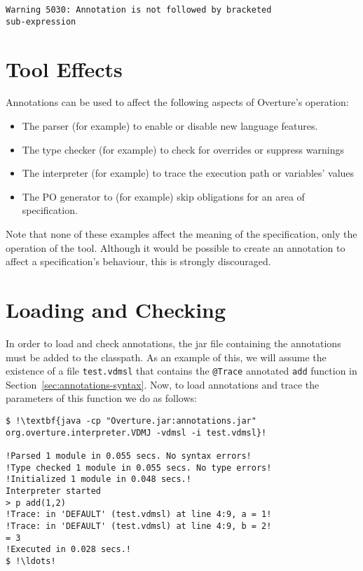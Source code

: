 \noindent \texttt{Warning 5030: Annotation is not followed by
  bracketed\\ sub-expression}\\

\section{Tool Effects}

Annotations can be used to affect the following aspects of Overture's
operation:

\begin{itemize}
  \item The parser (for example) to enable or disable new language
  features.
  \item The type checker (for example) to check for overrides or
  suppress warnings
  \item The interpreter (for example) to trace the execution path or
  variables' values
  \item The PO generator to (for example) skip obligations for an area
  of specification.
\end{itemize}

Note that none of these examples affect the meaning of the
specification, only the operation of the tool. Although it would be
possible to create an annotation to affect a specification's
behaviour, this is strongly discouraged.

\section{Loading and Checking}

In order to load and check annotations, the jar file containing the
annotations must be added to the classpath. As an example of this, we
will assume the existence of a file \lstinline[style=tool]|test.vdmsl|
that contains the \lstinline[language=VDM++]|@Trace| annotated
\lstinline[language=VDM++]|add| function in
Section~\ref{sec:annotations-syntax}. Now, to load annotations and
trace the parameters of this function we do as follows:

\begin{lstlisting}[style=tool,breaklines=true,escapechar=!,frame=tb,label={lst:annotations-cli-ex}]
$ !\textbf{java -cp "Overture.jar:annotations.jar" org.overture.interpreter.VDMJ -vdmsl -i test.vdmsl}!

!Parsed 1 module in 0.055 secs. No syntax errors!
!Type checked 1 module in 0.055 secs. No type errors!
!Initialized 1 module in 0.048 secs.!
Interpreter started
> p add(1,2)
!Trace: in 'DEFAULT' (test.vdmsl) at line 4:9, a = 1!
!Trace: in 'DEFAULT' (test.vdmsl) at line 4:9, b = 2!
= 3
!Executed in 0.028 secs.!
$ !\ldots!
\end{lstlisting}

